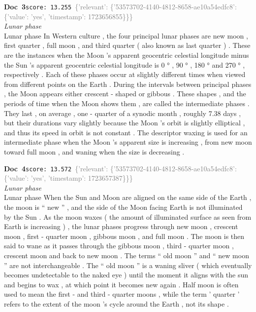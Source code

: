 \documentclass[a4paper,11pt]{article}
\begin{document}
\begin{docenv}
{\footnotesize\textcolor{doccolor}{\textbf{Doc~3}}}\hfill{\tiny\texttt{score:~13.255}}\ {\tiny\textcolor{gray}{\{'relevant': \{'53573702-4140-4812-8658-ae10a54edfc8': \{'value': 'yes', 'timestamp': 1723656855\}\}\}}}\\[3pt]
{\small\textit{Lunar phase}}\\[2pt]
\vspace{2pt}
{\footnotesize Lunar phase
In Western culture , the four principal lunar phases are new moon , first quarter , full moon , and third quarter ( also known as last quarter ) . These are the instances when the Moon 's apparent geocentric celestial longitude minus the Sun 's apparent geocentric celestial longitude is 0 ° , 90 ° , 180 ° and 270 ° , respectively . Each of these phases occur at slightly different times when viewed from different points on the Earth . During the intervals between principal phases , the Moon appears either crescent - shaped or gibbous . These shapes , and the periods of time when the Moon shows them , are called the intermediate phases . They last , on average , one - quarter of a synodic month , roughly 7.38 days , but their durations vary slightly because the Moon 's orbit is slightly elliptical , and thus its speed in orbit is not constant . The descriptor waxing is used for an intermediate phase when the Moon 's apparent size is increasing , from new moon toward full moon , and waning when the size is decreasing .}
\end{docenv}
\begin{docenv}
{\footnotesize\textcolor{doccolor}{\textbf{Doc~4}}}\hfill{\tiny\texttt{score:~13.572}}\ {\tiny\textcolor{gray}{\{'relevant': \{'53573702-4140-4812-8658-ae10a54edfc8': \{'value': 'yes', 'timestamp': 1723657387\}\}\}}}\\[3pt]
{\small\textit{Lunar phase}}\\[2pt]
\vspace{2pt}
{\footnotesize Lunar phase
When the Sun and Moon are aligned on the same side of the Earth , the moon is `` new '' , and the side of the Moon facing Earth is not illuminated by the Sun . As the moon waxes ( the amount of illuminated surface as seen from Earth is increasing ) , the lunar phases progress through new moon , crescent moon , first - quarter moon , gibbous moon , and full moon . The moon is then said to wane as it passes through the gibbous moon , third - quarter moon , crescent moon and back to new moon . The terms `` old moon '' and `` new moon '' are not interchangeable . The `` old moon '' is a waning sliver ( which eventually becomes undetectable to the naked eye ) until the moment it aligns with the sun and begins to wax , at which point it becomes new again . Half moon is often used to mean the first - and third - quarter moons , while the term ' quarter ' refers to the extent of the moon 's cycle around the Earth , not its shape .}
\end{docenv}
\end{document}
